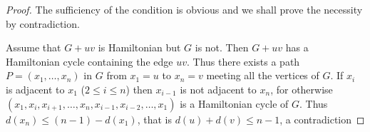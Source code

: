 \documentclass[12pt]{article}
\begin{document}
\begin{proof}
The sufficiency of the condition is obvious and we shall prove the necessity by
contradiction.

Assume that $G+uv$ is Hamiltonian but $G$ is not.
Then $G+uv$ has a Hamiltonian cycle containing the edge $uv$. Thus there exists a path $P=(x_1,\dots,x_n)$ in $G$ from $x_1=u$ to $x_n=v$ meeting all the vertices of $G$. If $x_i$ is adjacent to $x_1$ ($2\leq i\leq n$) then $x_{i-1}$ is not adjacent to $x_n$, for otherwise
$(x_1,x_i,x_{i+1},\dots,x_n,x_{i-1},x_{i-2},\dots,x_1)$ is a Hamiltonian cycle of $G$. Thus $d(x_n)\leq (n-1)-d(x_1)$, that is $d(u)+d(v)\leq n-1$, a contradiction
\end{proof}
\end{document}

